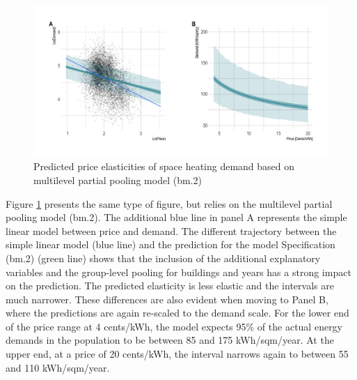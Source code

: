 \documentclass[12pt,twoside]{reedthesis}
\begin{document}
\begin{figure}

{\centering \includegraphics[width=1.04\linewidth]{figure/bm2_prediction} 

}

\caption{Predicted price elasticities of space heating demand based on multilevel partial pooling model (bm.2)}\label{fig:elasticity-predictions-bm2}
\end{figure}
Figure \ref{fig:elasticity-predictions-bm2} presents the same type of figure, but relies on the multilevel partial pooling model (bm.2). The additional blue line in panel A represents the simple linear model between price and demand. The different trajectory between the simple linear model (blue line) and the prediction for the model Specification (bm.2) (green line) shows that the inclusion of the additional explanatory variables and the group-level pooling for buildings and years has a strong impact on the prediction. The predicted elasticity is less elastic and the intervals are much narrower. These differences are also evident when moving to Panel B, where the predictions are again re-scaled to the demand scale. For the lower end of the price range at 4 cents/kWh, the model expects 95\% of the actual energy demands in the population to be between 85 and 175 kWh/sqm/year. At the upper end, at a price of 20 cents/kWh, the interval narrows again to between 55 and 110 kWh/sqm/year.
\end{document}
